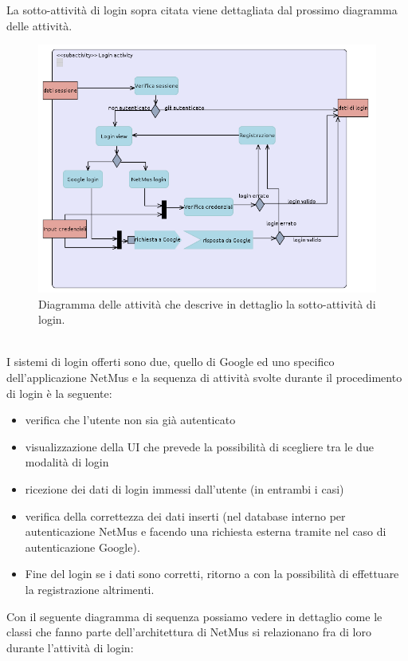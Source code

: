 La sotto-attivit\`a di login sopra citata viene dettagliata dal prossimo diagramma
delle attivit\`a.
\begin{figure}[!h]
  \centering
  \includegraphics[width=15cm]{img/ST/login.png}
\caption{Diagramma delle attivit\`a che descrive in dettaglio la
sotto-attivit\`a di login.}
\end{figure}
\\
I sistemi di login offerti sono due, quello di Google ed uno specifico
dell'applicazione NetMus e la sequenza di attivit\`a svolte durante il
procedimento di login \`e la seguente:
\begin{itemize}
  \item verifica che l'utente non sia gi\`a autenticato
  \item visualizzazione della UI  che prevede la possibilit\`a di
  scegliere tra le due modalit\`a di login
  \item ricezione dei dati di login immessi dall'utente (in entrambi i casi)
  \item verifica della correttezza dei dati inserti (nel database interno per
  autenticazione NetMus e facendo una richiesta esterna tramite
   nel caso di autenticazione Google).
  \item Fine del login se i dati sono corretti, ritorno a  con la
  possibilit\`a di effettuare la registrazione altrimenti.
\end{itemize}

\vspace{1cm}
Con il seguente diagramma di sequenza possiamo vedere in dettaglio come le
classi che fanno parte dell'architettura di NetMus si relazionano fra di loro
durante l'attivit\`a di login:

